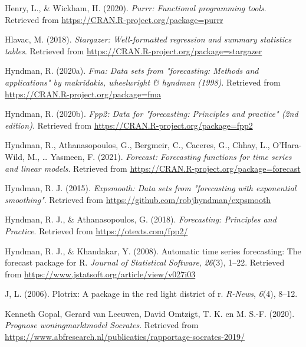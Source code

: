 \documentclass[
]{article}
\begin{document}
\leavevmode\hypertarget{ref-R-purrr}{}%
Henry, L., \& Wickham, H. (2020). \emph{Purrr: Functional programming
tools}. Retrieved from \url{https://CRAN.R-project.org/package=purrr}

\leavevmode\hypertarget{ref-R-stargazer}{}%
Hlavac, M. (2018). \emph{Stargazer: Well-formatted regression and
summary statistics tables}. Retrieved from
\url{https://CRAN.R-project.org/package=stargazer}

\leavevmode\hypertarget{ref-R-fma}{}%
Hyndman, R. (2020a). \emph{Fma: Data sets from "forecasting: Methods and
applications" by makridakis, wheelwright \& hyndman (1998)}. Retrieved
from \url{https://CRAN.R-project.org/package=fma}

\leavevmode\hypertarget{ref-R-fpp2}{}%
Hyndman, R. (2020b). \emph{Fpp2: Data for "forecasting: Principles and
practice" (2nd edition)}. Retrieved from
\url{https://CRAN.R-project.org/package=fpp2}

\leavevmode\hypertarget{ref-R-forecast}{}%
Hyndman, R., Athanasopoulos, G., Bergmeir, C., Caceres, G., Chhay, L.,
O'Hara-Wild, M., \ldots{} Yasmeen, F. (2021). \emph{Forecast:
Forecasting functions for time series and linear models}. Retrieved from
\url{https://CRAN.R-project.org/package=forecast}

\leavevmode\hypertarget{ref-R-expsmooth}{}%
Hyndman, R. J. (2015). \emph{Expsmooth: Data sets from "forecasting with
exponential smoothing"}. Retrieved from
\url{https://github.com/robjhyndman/expsmooth}

\leavevmode\hypertarget{ref-Hyndman2018}{}%
Hyndman, R. J., \& Athanasopoulos, G. (2018). \emph{Forecasting:
Principles and Practice}. Retrieved from \url{https://otexts.com/fpp2/}

\leavevmode\hypertarget{ref-forecast2008}{}%
Hyndman, R. J., \& Khandakar, Y. (2008). Automatic time series
forecasting: The forecast package for R. \emph{Journal of Statistical
Software}, \emph{26}(3), 1--22. Retrieved from
\url{https://www.jstatsoft.org/article/view/v027i03}

\leavevmode\hypertarget{ref-plotrix2006}{}%
J, L. (2006). Plotrix: A package in the red light district of r.
\emph{R-News}, \emph{6}(4), 8--12.

\leavevmode\hypertarget{ref-KennethGopalGerardvanLeeuwenDavidOmtzigt2020}{}%
Kenneth Gopal, Gerard van Leeuwen, David Omtzigt, T. K. en M. S.-F.
(2020). \emph{Prognose woningmarktmodel Socrates}. Retrieved from
\url{https://www.abfresearch.nl/publicaties/rapportage-socrates-2019/}
\end{document}
